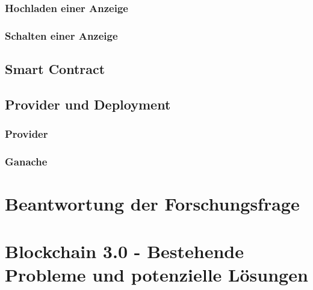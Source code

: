 \subsubsection{Hochladen einer Anzeige}
\subsubsection{Schalten einer Anzeige}

\subsection{Smart Contract}
\subsection{Provider und Deployment}
\subsubsection{Provider}
\subsubsection{Ganache}
\section{Beantwortung der Forschungsfrage}
\section{Blockchain 3.0 - Bestehende Probleme und potenzielle Lösungen}